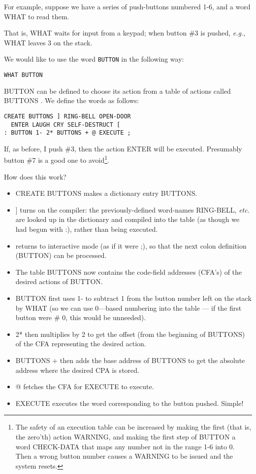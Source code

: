 For example, suppose we have a series of push-buttons numbered 1-6, and a word WHAT to read them.

That is, WHAT waits for input from a keypad; when button \#3 is pushed, \textit{e.g.}, WHAT leaves 3 on the stack.

We would like to use the word \lstinline$BUTTON$ in the following way:

\begin{lstlisting}
WHAT BUTTON
\end{lstlisting}

BUTTON can be defined to choose its action from a table of
actions called BUTTONS . We define the words as follows:

\begin{lstlisting}
CREATE BUTTONS ] RING-BELL OPEN-DOOR
  ENTER LAUGH CRY SELF-DESTRUCT [
: BUTTON 1- 2* BUTTONS + @ EXECUTE ;
\end{lstlisting}

If, as before, I push \#3, then the action ENTER will be executed. Presumably button \#7 is a good one to avoid\footnote{The safety of an execution table can be increased by making the first (that is, the zero’th) action WARNING, and making the first step of BUTTON a word CHECK-DATA that maps any number not in the range 1-6 into 0. Then a wrong button number causes a WARNING to be issued and the system resets.}.

How does this work?
\begin{itemize}
    \item CREATE BUTTONS makes a dictionary entry BUTTONS.
    \item ] turns on the compiler: the previously-defined word-names RING-BELL, \textit{etc}. are looked up in the dictionary and compiled into the table (as though we had begun with :), rather than being executed.
    \item \rbrack returns to interactive mode (as if it were ;), so that the next colon definition (BUTTON) can be processed.
    \item The table BUTTONS now contains the code-field addresses (CFA’s) of the desired actions of BUTTON.
    \item BUTTON first uses 1- to subtract 1 from the button number left on the stack by WHAT (so we can use 0—based numbering into the table — if the first button were \# 0, this would be unneeded).
    \item 2* then multiplies by 2 to get the offset (from the beginning of BUTTONS) of the CFA representing the desired action.
    \item BUTTONS + then adds the base address of BUTTONS to get the absolute address where the desired CPA is stored.
    \item @ fetches the CFA for EXECUTE to execute.
    \item EXECUTE executes the word corresponding to the button pushed. Simple!
\end{itemize}

